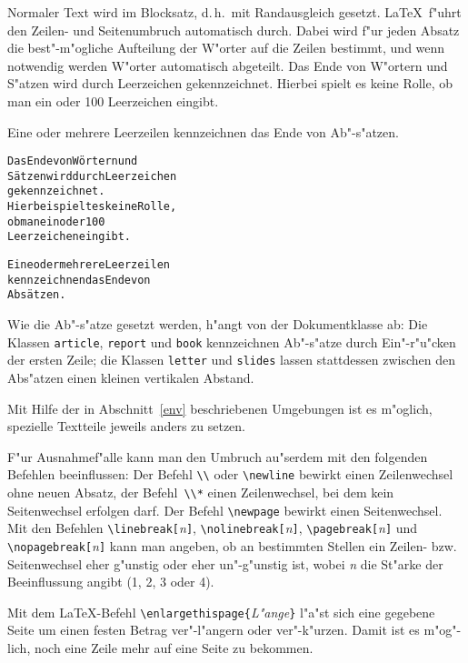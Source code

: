 Normaler Text wird im Blocksatz, d.\,h.~mit Randausgleich
gesetzt.  \LaTeX\ f"uhrt den Zeilen- und Seiten\-umbruch
automatisch durch.  Dabei wird f"ur jeden Absatz die
best"-m"ogliche Aufteilung der W"orter auf die Zeilen bestimmt,
und wenn notwendig werden W"orter automatisch abgeteilt.
\exa
\parindent=17pt\relax
{}\relax %
\noindent Das Ende von W"ortern und S"atzen wird durch Leerzeichen
gekennzeichnet.  Hierbei spielt es keine Rolle, ob man ein oder
100 Leerzeichen eingibt.
\par
Eine oder mehrere Leerzeilen
kennzeichnen das Ende von
Ab"-s"atzen.
\exb
\begin{alltt}
Das Ende von W\"ortern und
S\"atzen wird durch Leerzeichen 
gekennzeichnet.
Hierbei spielt es keine Rolle,
ob man ein  oder           100
Leerzeichen eingibt.
 
Eine oder mehrere Leerzeilen
kennzeichnen das Ende von
Abs\"atzen.
\end{alltt}
\exc
Wie die Ab"-s"atze gesetzt werden, h"angt von der Dokumentklasse ab: 
Die Klassen 
\texttt{article}, \texttt{report} und \texttt{book} kennzeichnen
Ab"-s"atze durch Ein"-r"u"cken der ersten Zeile;
die Klassen \texttt{letter} und \texttt{slides} lassen stattdessen 
zwischen den Abs"atzen einen kleinen vertikalen Abstand.

Mit Hilfe der in Abschnitt~\ref{env} beschriebenen Umgebungen ist
es m"oglich, spezielle Textteile jeweils anders zu setzen.
 
F"ur Ausnahmef"alle kann man den Umbruch au"serdem mit den
folgenden Befehlen beeinflussen:
Der Befehl \verb|\\| oder \verb|\newline| bewirkt einen
Zeilenwechsel ohne neuen Absatz, der Befehl~\verb|\\*| einen
Zeilenwechsel, bei dem kein Seitenwechsel erfolgen darf.
Der Befehl \verb|\newpage| bewirkt einen Seitenwechsel.
Mit den Befehlen
\verb|\linebreak[|\textit{n}\verb|]|,
\verb|\nolinebreak[|\textit{n}\verb|]|,
\verb|\pagebreak[|\textit{n}\verb|]|   und
\verb|\nopagebreak[|\textit{n}\verb|]|
kann man angeben, ob an bestimmten Stellen ein Zeilen- bzw.\ %
Seitenwechsel eher g"unstig oder eher un"-g"unstig ist, wobei
\textit{n} die St"arke der Beeinflussung angibt (1, 2, 3 oder 4).

Mit dem \LaTeX-Befehl \verb:\enlargethispage{:\textit{L"ange}\verb:}:
l"a"st sich eine gegebene Seite um einen festen Betrag
ver"-l"angern oder ver"-k"urzen. Damit ist es m"og"-lich, noch
eine Zeile mehr auf eine Seite zu bekommen.
 
